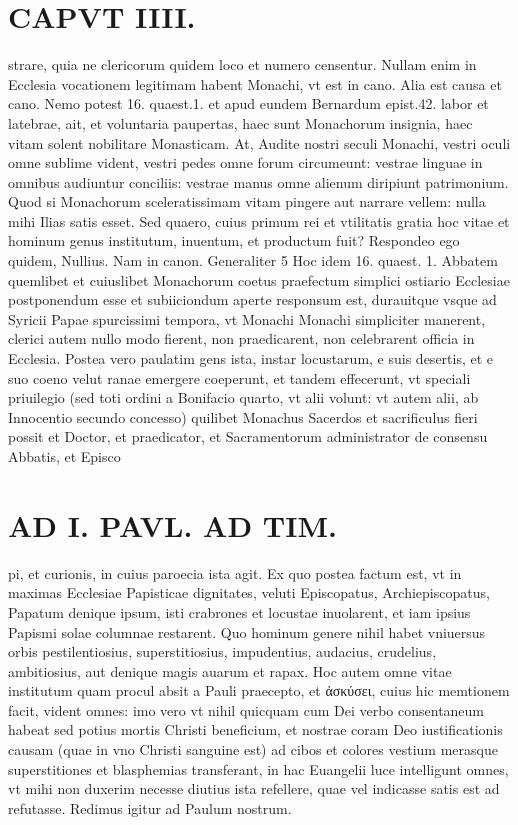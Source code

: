 \documentclass{article}
\begin{document}
\begin{pages}
\section*{CAPVT  IIII. }
\marginpar{[ p.223 ]}\pstart strare, quia ne clericorum quidem loco et numero censentur. Nullam enim in Ecclesia vocationem legitimam habent Monachi, vt est in cano. Alia est causa et cano. Nemo potest 16. quaest.1. et apud eundem Bernardum epist.42. labor et latebrae, ait, et voluntaria paupertas, haec sunt Monachorum insignia, haec vitam solent nobilitare Monasticam. At, Audite nostri seculi Monachi, vestri oculi omne sublime vident, vestri pedes omne forum circumeunt: vestrae linguae in omnibus audiuntur conciliis: vestrae manus omne alienum diripiunt patrimonium. Quod si Monachorum sceleratissimam vitam pingere aut narrare vellem: nulla mihi Ilias satis esset. Sed quaero, cuius primum rei et vtilitatis gratia hoc vitae et hominum genus institutum, inuentum, et productum fuit? Respondeo ego quidem, Nullius. Nam in canon. Generaliter 5 Hoc idem 16. quaest. 1. Abbatem quemlibet et cuiuslibet Monachorum coetus praefectum simplici ostiario Ecclesiae postponendum esse et subiiciondum aperte responsum est, durauitque vsque ad Syricii Papae spurcissimi tempora, vt Monachi Monachi simpliciter manerent, clerici autem nullo modo fierent, non praedicarent, non celebrarent officia in Ecclesia. Postea vero paulatim gens ista, instar locustarum, e suis desertis, et e suo coeno velut ranae emergere coeperunt, et tandem effecerunt, vt speciali priuilegio (sed toti ordini a Bonifacio quarto, vt alii volunt: vt autem alii, ab Innocentio secundo concesso) quilibet Monachus Sacerdos et sacrificulus fieri possit et Doctor, et praedicator, et Sacramentorum administrator de consensu Abbatis, et Episco\pend
\section*{AD I. PAVL. AD TIM. }
\marginpar{[ p.224 ]}\pstart pi, et curionis, in cuius paroecia ista agit. Ex quo postea factum est, vt in maximas Ecclesiae Papisticae dignitates, veluti Episcopatus, Archiepiscopatus, Papatum denique ipsum, isti crabrones et locustae inuolarent, et iam ipsius Papismi solae columnae restarent. Quo hominum genere nihil habet vniuersus orbis pestilentiosius, superstitiosius, impudentius, audacius, crudelius, ambitiosius, aut denique magis auarum et rapax. Hoc autem omne vitae institutum quam procul absit a Pauli praecepto, et ἀσκύσει, cuius hic memtionem facit, vident omnes: imo vero vt nihil quicquam cum Dei verbo consentaneum habeat sed potius mortis Christi beneficium, et nostrae coram Deo iustificationis causam (quae in vno Christi sanguine est) ad cibos et colores vestium merasque superstitiones et blasphemias transferant, in hac Euangelii luce intelligunt omnes, vt mihi non duxerim necesse diutius ista refellere, quae vel indicasse satis est ad refutasse. Redimus igitur ad Paulum nostrum.  \pend
{}
{}

\end{pages}
\end{document}
